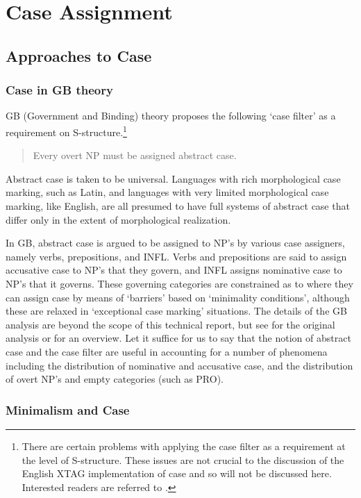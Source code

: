 
\chapter{Case Assignment}
\label{case-assignment}
\section{Approaches to Case}
\subsection{Case in GB theory}

GB (Government and Binding) theory proposes the following
`case filter' as a requirement on S-structure.\footnote{There are certain
problems with applying the case filter as a requirement at the level of
S-structure.  These issues are not crucial to the discussion of the English
XTAG implementation of case and so will not be discussed here.  Interested
readers are referred to
\cite{lasnik-uriagereka88}.}

\begin{verse}
Every overt NP must be assigned abstract case. \cite{haegeman91}
\end{verse}

Abstract case is taken to be universal.  Languages with rich morphological case
marking, such as Latin, and languages with very limited morphological case
marking, like English, are all presumed to have full systems of abstract case
that differ only in the extent of morphological realization.

In GB, abstract case is argued to be assigned to NP's by various case
assigners, namely verbs, prepositions, and INFL.  Verbs and
prepositions are said to assign accusative case to NP's that they
govern, and INFL assigns nominative case to NP's that it governs.
These governing categories are constrained as to where they can assign
case by means of `barriers' based on `minimality conditions', although
these are relaxed in `exceptional case marking' situations.  The
details of the GB analysis are beyond the scope of this technical
report, but see \cite{chomsky86} for the original analysis or
\cite{haegeman91} for an overview.  Let it suffice for us to say that
the notion of abstract case and the case filter are useful in
accounting for a number of phenomena including the distribution of
nominative and accusative case, and the distribution of overt NP's and
empty categories (such as PRO).

\subsection{Minimalism and Case} 

